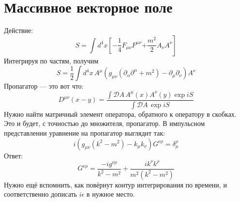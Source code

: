 \documentclass{article}
\newcommand{\p}{\partial}
\begin{document}
\section{Массивное векторное поле}
Действие:
\begin{equation}
S = \int d^4x \left[  -\frac14 F_{\mu\nu} F^{\mu\nu}  \right.
		\left.	+ \frac{m^2}{2} A_{\nu}A^{\nu} \right]
\end{equation}
Интегрируя по частям, получим
\begin{equation}
S = \frac12\int d^4 x\,  A^{\mu}
	 (g_{\mu\nu}(\p_{\alpha}\p^{\alpha} + m^2) - \p_{\mu}\p_{\nu}) A^{\nu}
\end{equation}
Пропагатор --- это вот что:
\begin{equation}
D^{\mu\nu}(x - y) = \frac{\int \mathcal{D}A\, A^{\mu}(x)A^{\nu}(y)\exp{iS}}
					{\int \mathcal{D}A\,\exp{iS}}
\end{equation}
Нужно найти матричный элемент оператора, обратного к оператору в скобках. Это и будет, с
точностью до множителя, пропагатор.
В импульсном представлении уравнение на пропагатор выглядит так:
	\begin{equation}
		i(g_{\mu\nu}(k^2 - m^2) - k_{\mu}k_{\nu})G^{\nu\rho} = \delta_{\mu}^{\rho}
	\end{equation}
Ответ:
	\begin{equation}
		G^{\nu\rho} = \frac{-ig^{\nu\rho}}{k^2 - m^2} + 
						\frac{ik^{\nu} k^\rho}{m^2(k^2 - m^2)}
	\end{equation}
Нужно ещё вспомнить, как повёрнут контур интегрирования по времени, и соответственно дописать
$i\epsilon$  в нужное место.
\end{document}
